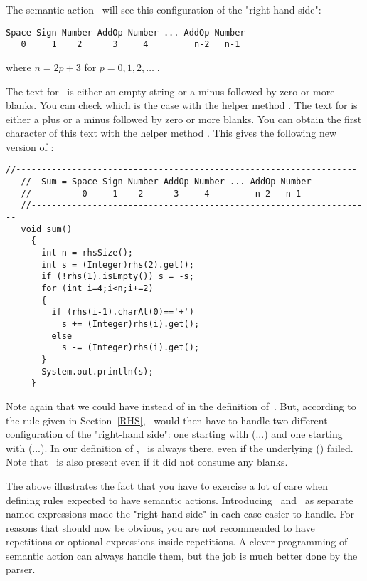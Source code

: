 \newpage
The semantic action \Suma\ will see this configuration
of the "right-hand side":

\small
\begin{Verbatim}[samepage=true,xleftmargin=15mm,baselinestretch=0.9]
 Space Sign Number AddOp Number ... AddOp Number
   0     1    2      3     4         n-2   n-1
\end{Verbatim}
\normalsize

where $n = 2p + 3$ for $p = 0, 1, 2, \ldots\;$.

The text for \Sign\ is either an empty string
or a minus followed by zero or more blanks.
You can check which is the case with 
the helper method .
The text for  is either a plus or a minus  
followed by zero or more blanks.
You can obtain the first character of this text with
the helper method .
This gives the following new version of \Suma:

\smallskip
\small
\begin{Verbatim}[frame=single,framesep=2mm,samepage=true,xleftmargin=15mm,xrightmargin=15mm,baselinestretch=0.8]
   //-------------------------------------------------------------------
   //  Sum = Space Sign Number AddOp Number ... AddOp Number
   //          0     1    2      3     4         n-2   n-1
   //-------------------------------------------------------------------
   void sum()
     {
       int n = rhsSize();
       int s = (Integer)rhs(2).get();
       if (!rhs(1).isEmpty()) s = -s;
       for (int i=4;i<n;i+=2)
       {
         if (rhs(i-1).charAt(0)=='+')
           s += (Integer)rhs(i).get();
         else
           s -= (Integer)rhs(i).get();
       }
       System.out.println(s);
     }
\end{Verbatim}
\normalsize

Note again that we could have  instead of  in the definition of \Sum\,.
But, according to the rule given in Section~\ref{RHS}, 
\Suma\ would then have to handle two different configuration
of the "right-hand side": 
one starting with (...)
and one starting with (...).
In our definition of \Sum, \Sign\ is always there, even if the underlying () failed.
Note that \Space\ is also present even if it did not consume any blanks.

The above illustrates the fact that you have to exercise a lot of care when defining 
rules expected to have semantic actions.
Introducing \Digits\ and \Sign\ as separate named expressions
made the "right-hand side" in each case easier to handle.
For reasons that should now be obvious, you are not recommended
to have repetitions or optional expressions inside repetitions.
A clever programming of semantic action can always handle them,
but the job is much better done by the parser.

